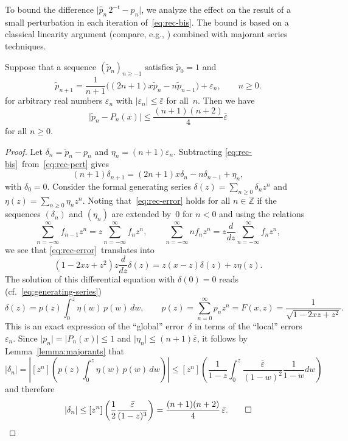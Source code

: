 \documentclass{siamart0216}
\newcommand{\abs}[1]{\mathopen| #1 \mathclose|}
\newcommand{\ddz}{\frac{d}{dz}}
\begin{document}
To bound the difference $\abs{\hat p_n \, 2^{-t} - p_n}$, we analyze
the effect on the result of a small perturbation in each iteration
of \eqref{eq:rec-bis}.
The bound is based on a classical linearity argument (compare, e.g.,
\cite{Wimp1984}) combined with majorant series techniques.

\begin{proposition} \label{prop:rec-error}
Suppose that a sequence $(\tilde p_n)_{n \geq -1}$ satisfies
$\tilde p_0 = 1$ and
\begin{equation} \label{eq:rec-pert}
  \tilde{p}_{n + 1} =
    \frac{1}{n+1}
    \bigl( (2n +1) x \tilde{p}_n - n \tilde{p}_{n-1} \bigr)
    + \varepsilon_n,
  \qquad n \geq 0.
\end{equation}
for arbitrary real numbers $\varepsilon_n$
with $\abs{\varepsilon_n} \leq \bar\varepsilon$ for all $n$.
Then we have
\[
  \abs{\tilde p_n  - P_n(x)}
  \leq \frac{(n+1)(n+2)}{4} \bar \varepsilon
\]
for all $n \geq 0$.
\end{proposition}

\begin{proof}
Let
$\delta_n = \tilde{p}_n - p_n$
and
$\eta_n = (n + 1) \varepsilon_n$.
Subtracting \eqref{eq:rec-bis} from \eqref{eq:rec-pert} gives
\begin{equation} \label{eq:rec-error}
  (n + 1) \delta_{n + 1}
  = (2 n + 1) x \delta_n - n \delta_{n - 1} + \eta_n,
\end{equation}
with $\delta_0 = 0$.
Consider the formal generating series
$\delta(z) = \sum_{n \geq 0} \delta_n z^n$
and
$\eta(z) = \sum_{n \geq 0} \eta_n z^n$.
Noting that \eqref{eq:rec-error} holds for all $n \in \mathbb{Z}$ if
the sequences $(\delta_n)$ and $(\eta_n)$ are extended by~$0$ for
$n < 0$
and using the relations
\[
  \sum_{n=-\infty}^{\infty} f_{n - 1} z^n
  = z \sum_{n=-\infty}^{\infty} f_n z^n,
  \qquad
  \sum_{n=-\infty}^{\infty} n f_{n} z^n
  = z \ddz \sum_{n=-\infty}^{\infty} f_n z^n,
\]
we see that \eqref{eq:rec-error} translates into
\[ (1 - 2 xz + z^2) z \ddz \delta (z)
   = z (x - z) \delta (z) + z \eta (z). \]
The solution of this differential equation with $\delta (0) = 0$ reads
(cf.~\eqref{eq:generating-series})
\[ \delta(z) = p(z)  \int_0^z \eta(w) \, p(w) \, dw,
   \qquad
   p(z) = \sum_{n=0}^{\infty} p_n z^n
        = F(x, z)
        = \frac{1}{\sqrt{1 - 2 xz + z^2}}. \]
This is an exact expression of the ``global'' error $\delta$ in terms
of the ``local'' errors~$\varepsilon_n$.
Since $\abs{p_n} = \abs{P_n(x)} \leq 1$
and $\abs{\eta_n} \leq (n+1) \bar \varepsilon$,
it follows by Lemma \ref{lemma:majorants} that
\[
  \abs{\delta_n}
  = \left| [z^n] \left( p(z)  \int_0^z \eta(w) \, p(w) \, dw \right) \right|
  \leq [z^n] \left(
    \frac{1}{1-z}
    \int_0^z \frac{\bar \varepsilon}{(1 - w)^2} \frac{1}{1-w} dw \right)
\]
and therefore
\[
  \abs{\delta_n}
  \leq [z^n] \left( \frac12 \frac{\bar \varepsilon}{(1-z)^3} \right)
  = \frac{(n+1)(n+2)}{4} \, \bar \varepsilon. \qed
\]
\end{proof}
\end{document}
